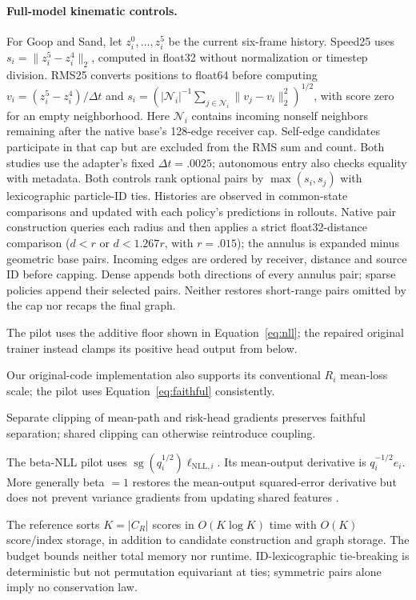 \paragraph{Full-model kinematic controls.}
For Goop and Sand, let $z_i^0,\ldots,z_i^5$ be the current six-frame history. Speed25 uses $s_i=\|z_i^5-z_i^4\|_2$, computed in float32 without normalization or timestep division. RMS25 converts positions to float64 before computing $v_i=(z_i^5-z_i^4)/\Delta t$ and $s_i=(|\mathcal N_i|^{-1}\sum_{j\in\mathcal N_i}\|v_j-v_i\|_2^2)^{1/2}$, with score zero for an empty neighborhood. Here $\mathcal N_i$ contains incoming nonself neighbors remaining after the native base's 128-edge receiver cap. Self-edge candidates participate in that cap but are excluded from the RMS sum and count. Both studies use the adapter's fixed $\Delta t=.0025$; autonomous entry also checks equality with metadata. Both controls rank optional pairs by $\max(s_i,s_j)$ with lexicographic particle-ID ties. Histories are observed in common-state comparisons and updated with each policy's predictions in rollouts. Native pair construction queries each radius and then applies a strict float32-distance comparison ($d<r$ or $d<1.267r$, with $r=.015$); the annulus is expanded minus geometric base pairs. Incoming edges are ordered by receiver, distance and source ID before capping. Dense appends both directions of every annulus pair; sparse policies append their selected pairs. Neither restores short-range pairs omitted by the cap nor recaps the final graph.

The pilot uses the additive floor shown in Equation~\ref{eq:nll}; the repaired original trainer instead clamps its positive head output from below.

Our original-code implementation also supports its conventional $R_i$ mean-loss scale; the pilot uses Equation~\ref{eq:faithful} consistently.

Separate clipping of mean-path and risk-head gradients preserves faithful separation; shared clipping can otherwise reintroduce coupling.

The beta-NLL pilot uses
$\operatorname{sg}(q_i^{1/2})\ell_{\mathrm{NLL},i}$.
Its mean-output derivative is $q_i^{-1/2}e_i$. More generally beta $=1$ restores the mean-output squared-error derivative but does not prevent variance gradients from updating shared features \citep{stirn2023}.

The reference sorts $K=|C_R|$ scores in $O(K\log K)$ time with $O(K)$ score/index storage, in addition to candidate construction and graph storage. The budget bounds neither total memory nor runtime. ID-lexicographic tie-breaking is deterministic but not permutation equivariant at ties; symmetric pairs alone imply no conservation law.

